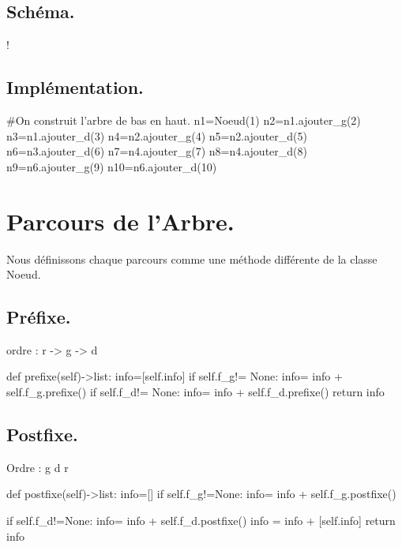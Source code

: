\documentclass{article}
\begin{document}
\subsection{Schéma.}
\begin{center}
\resizebox {\textwidth} {!} {

 }
\end{center}
\subsection{Implémentation.}
\begin{python}
    #On construit l'arbre de bas en haut.
    n1=Noeud(1)
    n2=n1.ajouter_g(2)
    n3=n1.ajouter_d(3)
    n4=n2.ajouter_g(4)
    n5=n2.ajouter_d(5)
    n6=n3.ajouter_d(6)
    n7=n4.ajouter_g(7)
    n8=n4.ajouter_d(8)
    n9=n6.ajouter_g(9)
    n10=n6.ajouter_d(10)
\end{python}


\section{Parcours de l'Arbre.}
 Nous définissons chaque parcours 
 comme une méthode différente de la classe Noeud.
\subsection{Préfixe.}
ordre : r -> g -> d
\begin{python}
    def prefixe(self)->list:
        info=[self.info]
        if self.f_g!= None:
            info= info + self.f_g.prefixe()
        if self.f_d!= None:
            info= info + self.f_d.prefixe() 
        return info
\end{python}
\subsection{Postfixe.}
Ordre : g d r
\begin{python}
    def postfixe(self)->list:
    info=[]
    if self.f_g!=None:
        info= info + self.f_g.postfixe()  
        
    if self.f_d!=None:
        info= info + self.f_d.postfixe()
    info = info + [self.info]
    return info
\end{python}
\end{document}
